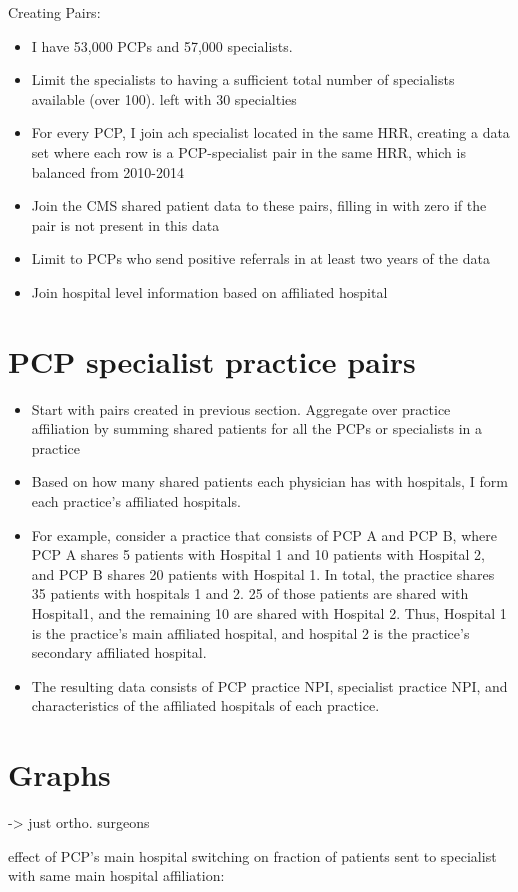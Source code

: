 \documentclass[12pt]{article}
\begin{document}
\noindent Creating Pairs:
\begin{itemize}
    \item I have 53,000 PCPs and 57,000 specialists. 
    \item Limit the specialists to having a sufficient total number of specialists available (over 100). left with 30 specialties
    \item For every PCP, I join ach specialist located in the same HRR, creating a data set where each row is a PCP-specialist pair in the same HRR, which is balanced from 2010-2014
    \item Join the CMS shared patient data to these pairs, filling in with zero if the pair is not present in this data
    \item Limit to PCPs who send positive referrals in at least two years of the data
    \item Join hospital level information based on affiliated hospital
\end{itemize}

\section{PCP specialist practice pairs}

\begin{itemize}
    \item Start with pairs created in previous section. Aggregate over practice affiliation by summing shared patients for all the PCPs or specialists in a practice
    \item Based on how many shared patients each physician has with hospitals, I form each practice's affiliated hospitals. 
    \item For example, consider a practice that consists of PCP A and PCP B, where PCP A shares 5 patients with Hospital 1 and 10 patients with Hospital 2, and PCP B shares 20 patients with Hospital 1. In total, the practice shares 35 patients with hospitals 1 and 2. 25 of those patients are shared with Hospital1, and the remaining 10 are shared with Hospital 2. Thus, Hospital 1 is the practice's main affiliated hospital, and hospital 2 is the practice's secondary affiliated hospital.
    \item The resulting data consists of PCP practice NPI, specialist practice NPI, and characteristics of the affiliated hospitals of each practice.  
\end{itemize}
	
	
\section{Graphs}
-> just ortho. surgeons

effect of PCP's main hospital switching on fraction of patients sent to specialist with same main hospital affiliation:
\end{document}
